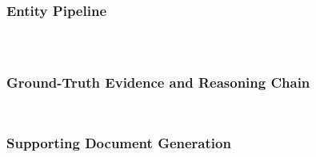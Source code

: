 \documentclass[]{servicenow}
\begin{document}
\subsubsection{Entity Pipeline}

\begin{tcolorbox}[title=Entity Extraction (Stage 1), breakable]
\inputminted[fontsize=\scriptsize, breaklines, breaksymbolleft={}, breaksymbolright={}]{markdown}{Prompts/entity_extraction.txt}
\end{tcolorbox}
\vspace{5pt}

\begin{tcolorbox}[title=Entity Profile Generation (Stage 2), breakable]
\inputminted[fontsize=\scriptsize, breaklines, breaksymbolleft={}, breaksymbolright={}]{markdown}{Prompts/entity_profile_generation.txt}
\end{tcolorbox}
\vspace{5pt}

\begin{tcolorbox}[title=Profile Assignment / Rewritten Background (Stage 3), breakable]
\inputminted[fontsize=\scriptsize, breaklines, breaksymbolleft={}, breaksymbolright={}]{markdown}{Prompts/entity_profile_assignment.txt}
\end{tcolorbox}

\subsubsection{Ground-Truth Evidence and Reasoning Chain}

\begin{tcolorbox}[title=Ground-Truth Evidence Extraction, breakable]
\inputminted[fontsize=\scriptsize, breaklines, breaksymbolleft={}, breaksymbolright={}]{markdown}{Prompts/gt_evidence_extraction.txt}
\end{tcolorbox}
\vspace{5pt}

\begin{tcolorbox}[title=Reasoning Chain Expansion, breakable]
\inputminted[fontsize=\scriptsize, breaklines, breaksymbolleft={}, breaksymbolright={}]{markdown}{Prompts/reasoning_chain_expansion.txt}
\end{tcolorbox}

\subsubsection{Supporting Document Generation}
\end{document}
